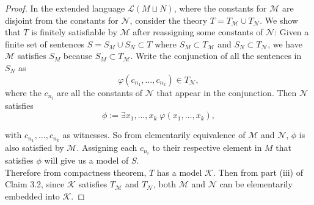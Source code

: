 \documentclass{article}
\begin{document}
\begin{enumerate}
    \begin{proof}
      In the extended language $\mathcal{L}(M\sqcup N)$, where the constants
      for $\mathcal{M}$ are disjoint from the constants for $\mathcal{N}$,
      consider the theory $T=T_\mathcal{M}\cup T_\mathcal{N}$. We show that
      $T$ is finitely satisfiable by $\mathcal{M}$ after reassigning some
      constants of $\mathcal{N}$: Given a finite set of sentences
      $S=S_M\cup S_N\subset T$ where $S_M\subset T_\mathcal{M}$ and
      $S_N\subset T_\mathcal{N}$, we have $\mathcal{M}$ satisfies $S_M$
      because $S_M\subset T_\mathcal{M}$. Write the conjunction of all the
      sentences in $S_N$ as
      \begin{equation*}
        \varphi(c_{n_1},\ldots,c_{n_k})\in T_\mathcal{N},
      \end{equation*}
      where the $c_{n_i}$ are all the constants of $\mathcal{N}$ that appear in
      the conjunction. Then $\mathcal{N}$ satisfies
      \begin{equation*}
        \phi := \exists x_1,\ldots,x_k\; \varphi(x_1,\ldots,x_k),
      \end{equation*}

      with $c_{n_1},\ldots,c_{n_k}$ as witnesses. So from elementarily
      equivalence of $\mathcal{M}$ and $\mathcal{N}$, $\phi$ is also
      satisfied by $\mathcal{M}$. Assigning each $c_{n_i}$ to their respective
      element in $M$ that satisfies $\phi$ will give us a model of $S$. \\

      Therefore from compactness theorem, $T$ has a model $\mathcal{K}$. Then
      from part (iii) of Claim 3.2, since $\mathcal{K}$ satisfies
      $T_\mathcal{M}$ and $T_\mathcal{N}$, both $\mathcal{M}$ and
      $\mathcal{N}$ can be elementarily embedded into $\mathcal{K}$.
    \end{proof}
\end{enumerate}
\end{document}
